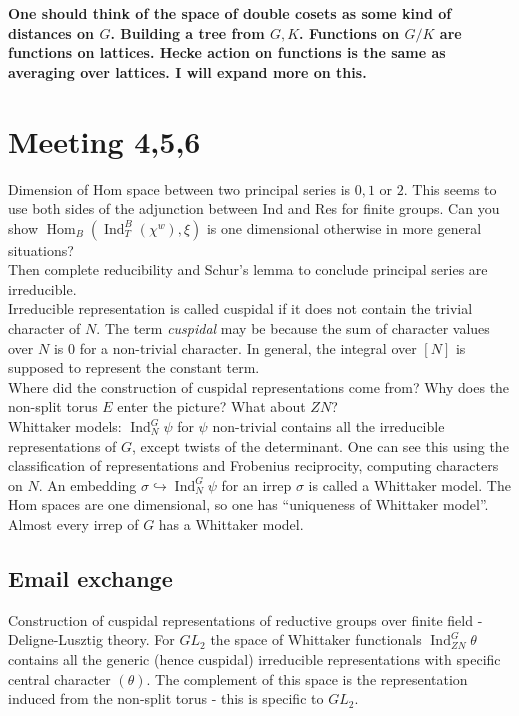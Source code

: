 \documentclass{amsart}
\numberwithin{equation}{section}
\theoremstyle{plain}
\theoremstyle{definition}
\theoremstyle{remark}
\renewcommand{\_}[2]{\underbrace{#1}_{#2}}
\renewcommand{\^}[2]{\overbrace{#1}_{#2}}
\newcommand{\Ind}{\operatorname{Ind}}
\newcommand{\Hom}{\operatorname{Hom}}
\begin{document}
\textbf{One should think of the space of double cosets as some kind of distances on $G$. Building a tree from $G,K$. Functions on $G/K$ are functions on lattices. Hecke action on functions is the same as averaging over lattices. I will expand more on this.}

\section{Meeting 4,5,6}

Dimension of Hom space between two principal series is $0,1$ or $2$. This seems to use both sides of the adjunction between Ind and Res for finite groups. Can you show $\Hom_B(\Ind_T^B(\chi^w), \xi)$ is one dimensional otherwise in more general situations? \\
Then complete reducibility and Schur's lemma to conclude principal series are irreducible.\\

Irreducible representation is called cuspidal if it does not contain the trivial character of $N$. The term \emph{cuspidal} may be because the sum of character values over $N$ is $0$ for a non-trivial character. In general, the integral over $[N]$ is supposed to represent the constant term. \\

Where did the construction of cuspidal representations come from? Why does the non-split torus $E$ enter the picture? What about $ZN$?\\

Whittaker models: $\Ind_N^G \psi$ for $\psi$ non-trivial contains all the irreducible representations of $G$, except twists of the determinant. One can see this using the classification of representations and Frobenius reciprocity, computing characters on $N$. An embedding $\sigma \hookrightarrow \Ind_N^G \psi$ for an irrep $\sigma$ is called a Whittaker model. The Hom spaces are one dimensional, so one has ``uniqueness of Whittaker model''. Almost every irrep of $G$ has a Whittaker model.

\subsection{Email exchange}

Construction of cuspidal representations of reductive groups over finite field - Deligne-Lusztig theory. For $GL_2$ the space of Whittaker functionals $\Ind_{ZN}^G \theta$ contains all the generic (hence cuspidal) irreducible representations with specific central character $(\theta)$. The complement of this space is the representation induced from the non-split torus - this is specific to $GL_2$. \\
\end{document}
